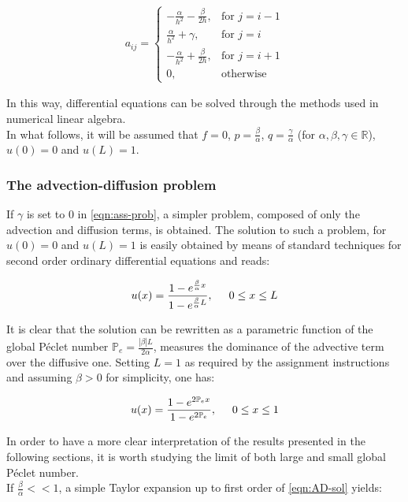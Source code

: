 \documentclass[11pt]{article}
\theoremstyle{theorem}
\theoremstyle{definition}
\begin{document}
\begin{align}
	\label{eqn:matrix}
	a_{ij} = \begin{cases}
	-\frac{\alpha}{h^2}-\frac{\beta}{2h}, & \text{for } j=i-1\\
	\frac{\alpha}{h^2}+\gamma, & \text{for } j=i\\
	-\frac{\alpha}{h^2}+\frac{\beta}{2h}, & \text{for } j=i+1\\
	0, &\text{otherwise}
	\end{cases}
\end{align}
	
In this way, differential equations can be solved through the methods used in numerical linear algebra.\\

In what follows, it will be assumed that $f=0$,  $p=\frac{\beta}{\alpha}$, $q=\frac{\gamma}{\alpha}$ (for $\alpha, \beta, \gamma\in\mathbb{R}$), $u(0)=0$ and $u(L)=1$.

\subsubsection{The advection-diffusion problem}
\label{subsubsec:ADprob}
If $\gamma$ is set to $0$ in \eqref{eqn:ass-prob}, a simpler problem, composed of only the advection and diffusion terms, is obtained. The solution to such a problem, for $u(0)=0$ and $u(L)=1$ is easily obtained by means of standard techniques for second order ordinary differential equations and reads:

\begin{align}
	\label{eqn:AD-sol}
	u(x)=\frac{1-e^{\frac{\beta}{\alpha}x}}{1-e^{\frac{\beta}{\alpha}L}},\hspace{5mm} 0\le x\le L
\end{align}

It is clear that the solution can be rewritten as a parametric function of the global P\'{e}clet number $\mathbb{P}_e=\frac{|\beta|L}{2\alpha}$, measures the dominance of the advective term over the diffusive one. Setting $L=1$ as required by the assignment instructions and assuming $\beta>0$ for simplicity, one has:

$$	u(x)=\frac{1-e^{2\mathbb{P}_ex}}{1-e^{2\mathbb{P}_e}}, \hspace{5mm} 0\le x\le 1 $$

In order to have a more clear interpretation of the results presented in the following sections, it is worth studying the limit of both large and small global P\'{e}clet number.\\
If $\frac{\beta}{\alpha}<<1$, a simple Taylor expansion up to first order of \eqref{eqn:AD-sol} yields:
\end{document}
